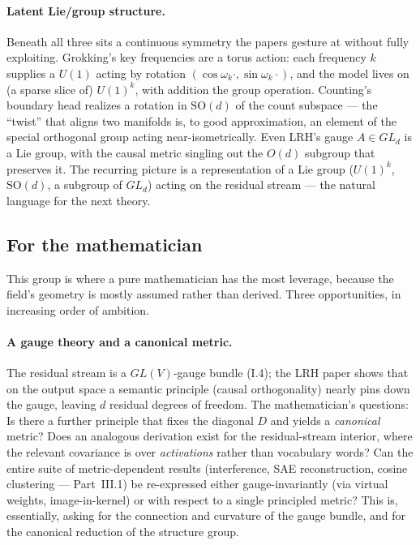 \paragraph*{Latent Lie/group structure.}
Beneath all three sits a continuous symmetry the papers gesture at without fully exploiting. Grokking's key frequencies are a torus action: each frequency $k$ supplies a $U(1)$ acting by rotation $(\cos\omega_k\cdot,\sin\omega_k\cdot)$, and the model lives on (a sparse slice of) $U(1)^{k}$, with addition the group operation. Counting's boundary head realizes a rotation in $\mathrm{SO}(d)$ of the count subspace --- the ``twist'' that aligns two manifolds is, to good approximation, an element of the special orthogonal group acting near-isometrically. Even LRH's gauge $A\in GL_d$ is a Lie group, with the causal metric singling out the $O(d)$ subgroup that preserves it. The recurring picture is a representation of a Lie group ($U(1)^k$, $\mathrm{SO}(d)$, a subgroup of $GL_d$) acting on the residual stream --- the natural language for the next theory.


\subsection*{For the mathematician}

This group is where a pure mathematician has the most leverage, because the field's geometry is mostly assumed rather than derived. Three opportunities, in increasing order of ambition.

\paragraph*{A gauge theory and a canonical metric.}
The residual stream is a $GL(V)$-gauge bundle (I.4); the LRH paper shows that on the output space a semantic principle (causal orthogonality) nearly pins down the gauge, leaving $d$ residual degrees of freedom. The mathematician's questions: Is there a further principle that fixes the diagonal $D$ and yields a \emph{canonical} metric? Does an analogous derivation exist for the residual-stream interior, where the relevant covariance is over \emph{activations} rather than vocabulary words? Can the entire suite of metric-dependent results (interference, SAE reconstruction, cosine clustering --- Part~III.1) be re-expressed either gauge-invariantly (via virtual weights, image-in-kernel) or with respect to a single principled metric? This is, essentially, asking for the connection and curvature of the gauge bundle, and for the canonical reduction of the structure group.

